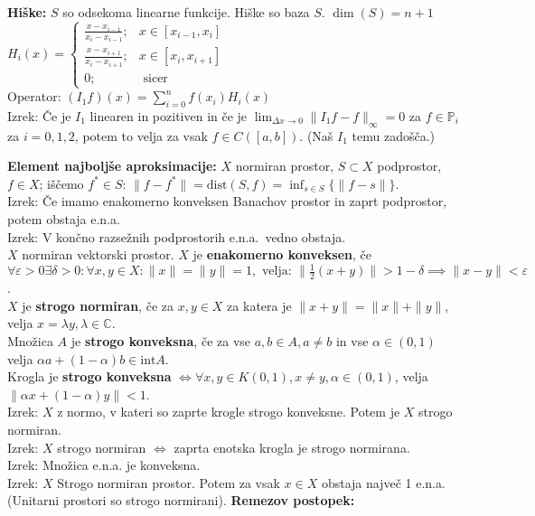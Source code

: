 \documentclass[a4paper,12pt]{article}
\theoremstyle{definition}
\def\C{\mathbb{C}}
\def\P{\mathbb{P}}
\newcommand{\eps}{\varepsilon}
\begin{document}
\textbf{Hiške:} $S$ so odsekoma linearne funkcije. Hiške so baza $S$. $\dim(S) = n+1$\\
$H_i(x) = \begin{cases}
\frac{x-x_{i-1}}{x_i - x_{i-1}}; & x \in [x_{i-1}, x_i]\\
\frac{x-x_{i+1}}{x_i - x_{i+1}}; & x \in [x_{i}, x_{i+1}]\\
0; & \text{ sicer}
\end{cases}$\\
Operator: $(I_1 f)(x) = \sum_{i = 0}^n f(x_i) H_i(x)$\\
Izrek: Če je $I_1$ linearen in pozitiven in če je $\lim_{\Delta x \to 0} \|I_1
f - f\|_{\infty} = 0$ za $f \in \P_i$ za $i = 0,1,2$, potem to velja za vsak $f
\in C([a,b])$. (Naš $I_1$ temu zadošča.)

\textbf{Element najboljše aproksimacije:} $X$ normiran prostor, $S \subset X$
podprostor, $f \in X$; iščemo $f^* \in S$: $\|f - f^*\| = \text{dist}(S,f) =
\inf_{s \in S} \{\|f-s\|\}$.\\
Izrek: Če imamo enakomerno konveksen Banachov prostor in zaprt podprostor, potem obstaja e.n.a.\\
Izrek: V končno razsežnih podprostorih e.n.a.\ vedno obstaja.\\
$X$ normiran vektorski prostor. $X$ je \textbf{enakomerno konveksen}, če
$\forall \eps > 0 \exists \delta >0: \forall x,y \in X: \|x\| = \|y\| = 1,
\text{ velja: } \|\frac{1}{2} (x+y)\| > 1-\delta \implies \|x-y\| < \eps$.\\
$X$ je \textbf{strogo normiran}, če za $x,y \in X$ za katera je $\|x+y\| =
\|x\| + \|y\|$, velja $x = \lambda y, \lambda \in \C$.\\
Množica $A$ je \textbf{strogo konveksna}, če za vse $a,b \in A, a \neq b$ in
vse $\alpha \in (0,1)$ velja $\alpha a + (1-\alpha) b \in \text{int} A$.\\
Krogla je \textbf{strogo konveksna} $\iff \forall x,y \in K(0,1), x \neq y,
\alpha \in (0,1)$, velja $\|\alpha x + (1-\alpha) y\| < 1$.\\
Izrek: $X$ z normo, v kateri so zaprte krogle strogo konveksne. Potem je $X$
strogo normiran.\\
Izrek: $X$ strogo normiran $\iff$ zaprta enotska krogla je strogo normirana.\\
Izrek: Množica e.n.a. je konveksna. \\
Izrek: $X$ Strogo normiran prostor. Potem za vsak $x\in X$ obstaja največ 1
e.n.a. (Unitarni prostori so strogo normirani).
\textbf{Remezov postopek:}
\end{document}
